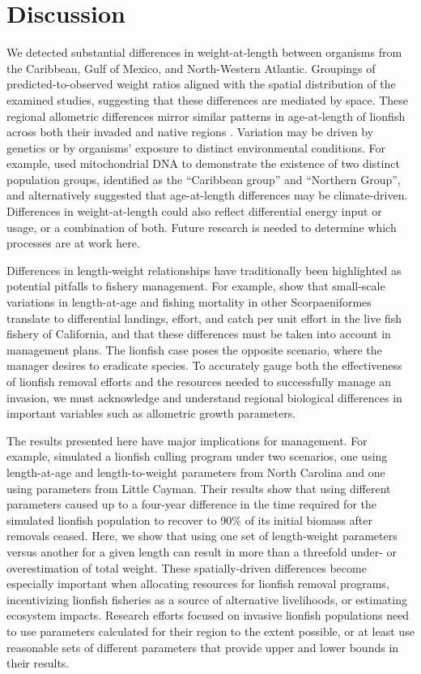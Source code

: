\documentclass[smallextended]{svjour3}       %
\begin{document}
\clearpage

\section{Discussion}\label{discussion}

We detected substantial differences in weight-at-length between
organisms from the Caribbean, Gulf of Mexico, and North-Western
Atlantic. Groupings of predicted-to-observed weight ratios aligned with
the spatial distribution of the examined studies, suggesting that these
differences are mediated by space. These regional allometric differences
mirror similar patterns in age-at-length of lionfish across both their
invaded and native regions \citep{pusack_2016}. Variation may be driven
by genetics or by organisms' exposure to distinct environmental
conditions. For example, \citet{betancurr_2011} used mitochondrial DNA
to demonstrate the existence of two distinct population groups,
identified as the ``Caribbean group'' and ``Northern Group'', and
\citet{fogg_2015} alternatively suggested that age-at-length differences
may be climate-driven. Differences in weight-at-length could also
reflect differential energy input or usage, or a combination of both.
Future research is needed to determine which processes are at work here.

Differences in length-weight relationships have traditionally been
highlighted as potential pitfalls to fishery management. For example,
\citet{wilson_2012} show that small-scale variations in length-at-age
and fishing mortality in other Scorpaeniformes translate to differential
landings, effort, and catch per unit effort in the live fish fishery of
California, and that these differences must be taken into account in
management plans. The lionfish case poses the opposite scenario, where
the manager desires to eradicate species. To accurately gauge both the
effectiveness of lionfish removal efforts and the resources needed to
successfully manage an invasion, we must acknowledge and understand
regional biological differences in important variables such as
allometric growth parameters.

The results presented here have major implications for management. For
example, \citet{edwards_2014} simulated a lionfish culling program under
two scenarios, one using length-at-age and length-to-weight parameters
from North Carolina and one using parameters from Little Cayman. Their
results show that using different parameters caused up to a four-year
difference in the time required for the simulated lionfish population to
recover to 90\% of its initial biomass after removals ceased. Here, we
show that using one set of length-weight parameters versus another for a
given length can result in more than a threefold under- or
overestimation of total weight. These spatially-driven differences
become especially important when allocating resources for lionfish
removal programs, incentivizing lionfish fisheries as a source of
alternative livelihoods, or estimating ecosystem impacts. Research
efforts focused on invasive lionfish populations need to use parameters
calculated for their region to the extent possible, or at least use
reasonable sets of different parameters that provide upper and lower
bounds in their results.
\end{document}
